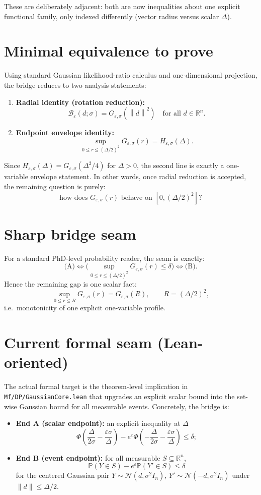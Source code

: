 \documentclass[11pt]{article}
\newcommand{\R}{\mathbb{R}}
\newcommand{\Pbb}{\mathbb{P}}
\newcommand{\N}{\mathcal{N}}
\newcommand{\norm}[1]{\left\lVert #1\right\rVert}
\newcommand{\PhiStd}{\Phi}
\newcommand{\Beps}{\mathcal{B}_\varepsilon}
\begin{document}
These are deliberately adjacent: both are now inequalities about one explicit
functional family, only indexed differently (vector radius versus scalar $\Delta$).

\section{Minimal equivalence to prove}
Using standard Gaussian likelihood-ratio calculus and one-dimensional projection,
the bridge reduces to two analysis statements:
\begin{enumerate}
\item \textbf{Radial identity (rotation reduction):}
\[
\Beps(d;\sigma)=G_{\varepsilon,\sigma}(\norm d^2)\quad\text{for all }d\in\R^n.
\]
\item \textbf{Endpoint envelope identity:}
\[
\sup_{0\le r\le (\Delta/2)^2} G_{\varepsilon,\sigma}(r)
=
H_{\varepsilon,\sigma}(\Delta).
\]
\end{enumerate}
Since $H_{\varepsilon,\sigma}(\Delta)=G_{\varepsilon,\sigma}(\Delta^2/4)$ for
$\Delta>0$, the second line is exactly a one-variable envelope statement.
In other words, once radial reduction is accepted, the remaining question is purely:
\[
\text{how does }G_{\varepsilon,\sigma}(r)\text{ behave on }[0,(\Delta/2)^2]?
\]

\section{Sharp bridge seam}
For a standard PhD-level probability reader, the seam is exactly:
\[
\text{(A)}
\Longleftrightarrow
\Big(\sup_{0\le r\le(\Delta/2)^2} G_{\varepsilon,\sigma}(r)\le \delta\Big)
\Longleftrightarrow
\text{(B)}.
\]
Hence the remaining gap is one scalar fact:
\[
\sup_{0\le r\le R} G_{\varepsilon,\sigma}(r)=G_{\varepsilon,\sigma}(R),
\qquad R=(\Delta/2)^2,
\]
i.e.\ monotonicity of one explicit one-variable profile.

\section{Current formal seam (Lean-oriented)}
The actual formal target is the theorem-level implication in
\texttt{Mf/DP/GaussianCore.lean} that upgrades an explicit scalar bound into the
set-wise Gaussian bound for all measurable events. Concretely, the bridge is:
\begin{itemize}
\item \textbf{End A (scalar endpoint):} an explicit inequality at $\Delta$
\[
\PhiStd\!\left(\frac{\Delta}{2\sigma}-\frac{\varepsilon\sigma}{\Delta}\right)
-e^\varepsilon
\PhiStd\!\left(-\frac{\Delta}{2\sigma}-\frac{\varepsilon\sigma}{\Delta}\right)
\le \delta;
\]
\item \textbf{End B (event endpoint):} for all measurable $S\subseteq\R^n$,
\[
\Pbb(Y\in S)-e^\varepsilon \Pbb(Y'\in S)\le \delta
\]
for the centered Gaussian pair $Y\sim\N(d,\sigma^2I_n)$,
$Y'\sim\N(-d,\sigma^2I_n)$ under $\|d\|\le \Delta/2$.
\end{itemize}
\end{document}
